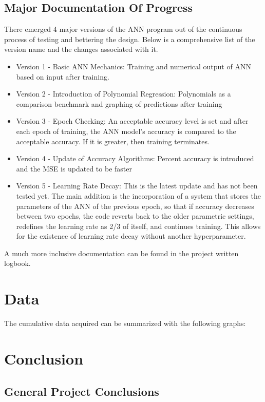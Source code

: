 \documentclass{article}
\begin{document}
\subsection{Major Documentation Of Progress}

There emerged 4 major versions of the ANN program out of the continuous process of testing and bettering the design. Below is a comprehensive list of the version name and the changes associated with it.

\begin{itemize}
    \item Version 1 - Basic ANN Mechanics: Training and numerical output of ANN based on input after training.
    \item Version 2 - Introduction of Polynomial Regression: Polynomials as a comparison benchmark and graphing of predictions after training
    \item Version 3 - Epoch Checking: An acceptable accuracy level is set and after each epoch of training, the ANN model's accuracy is compared to the acceptable accuracy. If it is greater, then training terminates.
    \item Version 4 - Update of Accuracy Algorithms: Percent accuracy is introduced and the MSE is updated to be faster
    \item Version 5 - Learning Rate Decay: This is the latest update and has not been tested yet. The main addition is the incorporation of a system that stores the parameters of the ANN of the previous epoch, so that if accuracy decreases between two epochs, the code reverts back to the older parametric settings, redefines the learning rate as 2/3 of itself, and continues training. This allows for the existence of learning rate decay without another hyperparameter.
\end{itemize}

A much more inclusive documentation can be found in the project written logbook.

\section{Data}
The cumulative data acquired can be summarized with the following graphs:

\section{Conclusion}
\subsection{General Project Conclusions}
\end{document}
